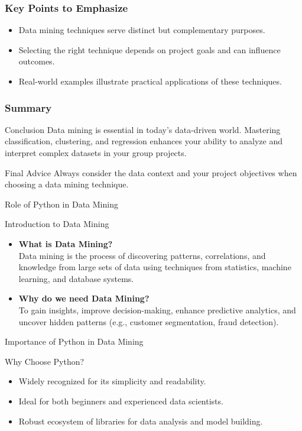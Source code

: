 \documentclass[aspectratio=169]{beamer}
\begin{document}
\begin{frame}[fragile]
    \frametitle{Key Points to Emphasize}
    \begin{itemize}
        \item Data mining techniques serve distinct but complementary purposes.
        \item Selecting the right technique depends on project goals and can influence outcomes.
        \item Real-world examples illustrate practical applications of these techniques.
    \end{itemize}
\end{frame}

\begin{frame}[fragile]
    \frametitle{Summary}
    \begin{block}{Conclusion}
        Data mining is essential in today’s data-driven world. Mastering classification, clustering, and regression enhances your ability to analyze and interpret complex datasets in your group projects.
    \end{block}
    \begin{block}{Final Advice}
        Always consider the data context and your project objectives when choosing a data mining technique.
    \end{block}
\end{frame}

\begin{frame}{Role of Python in Data Mining}
    \begin{block}{Introduction to Data Mining}
        \begin{itemize}
            \item \textbf{What is Data Mining?} \\ 
            Data mining is the process of discovering patterns, correlations, and knowledge from large sets of data using techniques from statistics, machine learning, and database systems.
            \item \textbf{Why do we need Data Mining?} \\
            To gain insights, improve decision-making, enhance predictive analytics, and uncover hidden patterns (e.g., customer segmentation, fraud detection).
        \end{itemize}
    \end{block}
\end{frame}

\begin{frame}{Importance of Python in Data Mining}
    \begin{block}{Why Choose Python?}
        \begin{itemize}
            \item Widely recognized for its simplicity and readability.
            \item Ideal for both beginners and experienced data scientists.
            \item Robust ecosystem of libraries for data analysis and model building.
        \end{itemize}
    \end{block}
\end{frame}
\end{document}
